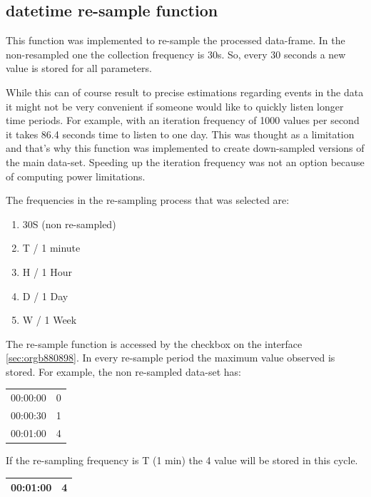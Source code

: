 \documentclass[11pt]{article}
\begin{document}
\subsection{datetime re-sample function}
\label{sec:orgf02d471}

This function was implemented to re-sample the processed data-frame.  In the non-resampled one the collection frequency is 30s. So, every 30 seconds a new value is stored for all parameters.

While this can of course result to precise estimations regarding events in the data it might not be very convenient if someone would like to quickly listen longer time periods.  For example, with an iteration frequency of 1000 values per second it takes 86.4 seconds time to listen to one day.  This was thought as a limitation and that's why this function was implemented to create down-sampled versions of the main data-set.  Speeding up the iteration frequency was not an option because of computing power limitations.

The frequencies in the re-sampling process that was selected are:
\begin{enumerate}
\item 30S (non re-sampled)
\item T / 1 minute
\item H / 1 Hour
\item D / 1 Day
\item W / 1 Week
\end{enumerate}

The re-sample function is accessed by the checkbox on the interface \ref{sec:orgb880898}.  In every re-sample period the maximum value observed is stored.  For example, the non re-sampled data-set has:

\begin{center}
\begin{tabular}{rr}
\hline
00:00:00 & 0\\
00:00:30 & 1\\
00:01:00 & 4\\
\hline
\end{tabular}
\end{center}

If the re-sampling frequency is T (1 min) the 4 value will be stored in this cycle.

\begin{center}
\begin{tabular}{rr}
\hline
00:01:00 & 4\\
\hline
\end{tabular}
\end{center}
\end{document}

